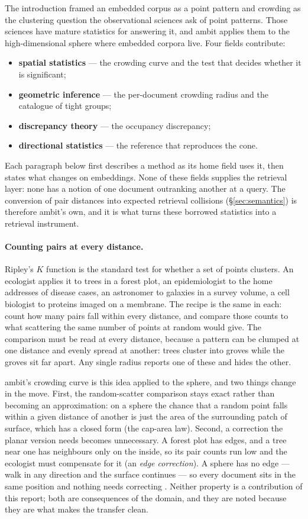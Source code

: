 \documentclass[11pt,letterpaper]{article}
\begin{document}
The introduction framed an embedded corpus as a point pattern and
crowding as the clustering question the observational sciences ask of
point patterns. Those sciences have mature statistics for answering it, and
\textsf{ambit} applies them to the high-dimensional sphere where
embedded corpora live. Four fields contribute:
\begin{itemize}
\item \textbf{spatial statistics} --- the crowding curve and the test
  that decides whether it is significant;
\item \textbf{geometric inference} --- the per-document crowding radius
  and the catalogue of tight groups;
\item \textbf{discrepancy theory} --- the occupancy discrepancy;
\item \textbf{directional statistics} --- the reference that reproduces
  the cone.
\end{itemize}
Each paragraph below first describes a method as its home field uses it,
then states what changes on embeddings. None of these fields supplies the
retrieval layer: none has a notion of one document outranking another at a
query. The conversion of pair distances into expected retrieval collisions
(\S\ref{sec:semantics}) is therefore \textsf{ambit}'s own, and it is what
turns these borrowed statistics into a retrieval instrument.

\paragraph{Counting pairs at every distance.}
Ripley's $K$ function \cite{ripley1976,besag1977} is the standard test for
whether a set of points clusters. An ecologist applies it to trees in a
forest plot, an epidemiologist to the home addresses of disease cases, an
astronomer to galaxies in a survey volume, a cell biologist to proteins
imaged on a membrane. The recipe is the same in each: count how many pairs
fall within every distance, and compare those counts to what scattering
the same number of points at random would give. The comparison must be
read at every distance, because a pattern can be clumped at one distance
and evenly spread at another: trees cluster into groves while the groves
sit far apart. Any single radius reports one of these and hides the other.

\textsf{ambit}'s crowding curve is this idea applied to the sphere, and
two things change in the move. First, the random-scatter comparison
stays exact rather than becoming an approximation: on a sphere the
chance that a random point falls within a given distance of another is
just the area of the surrounding patch of surface, which has a closed
form (the cap-area law). Second, a correction the planar version needs
becomes unnecessary. A forest plot has edges, and a tree near one has
neighbours only on the inside, so its pair counts run low and the
ecologist must compensate for it (an \emph{edge correction}). A sphere
has no edge --- walk in any direction and the surface continues --- so
every document sits in the same position and nothing needs correcting
\cite{robeson2014}. Neither property is a contribution of this report;
both are consequences of the domain, and they are noted because they are
what makes the transfer clean.
\end{document}
